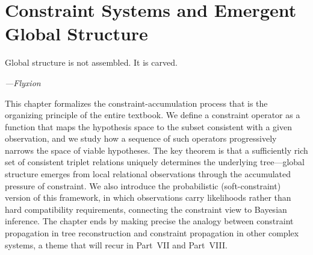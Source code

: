 \chapter{Constraint Systems and Emergent Global Structure}
\label{ch:constraints}

\epigraph{%
  Global structure is not assembled. It is carved.%
}{\textit{---Flyxion}}

This chapter formalizes the constraint-accumulation process that is the organizing principle of the entire textbook. We define a constraint operator as a function that maps the hypothesis space to the subset consistent with a given observation, and we study how a sequence of such operators progressively narrows the space of viable hypotheses. The key theorem is that a sufficiently rich set of consistent triplet relations uniquely determines the underlying tree---global structure emerges from local relational observations through the accumulated pressure of constraint. We also introduce the probabilistic (soft-constraint) version of this framework, in which observations carry likelihoods rather than hard compatibility requirements, connecting the constraint view to Bayesian inference. The chapter ends by making precise the analogy between constraint propagation in tree reconstruction and constraint propagation in other complex systems, a theme that will recur in Part~VII and Part~VIII.

